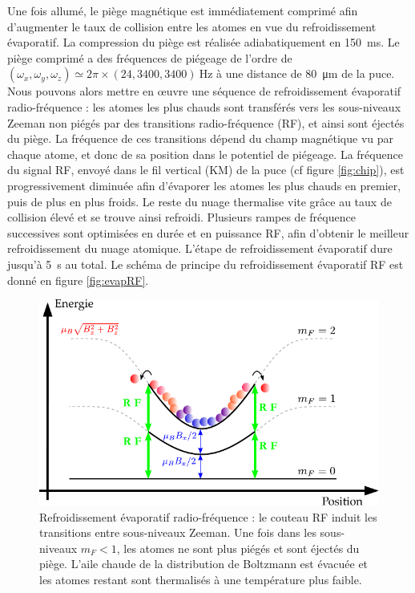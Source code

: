 Une fois allumé, le piège magnétique est immédiatement comprimé afin d'augmenter le taux de collision entre les atomes en vue du refroidissement évaporatif.
La compression du piège est réalisée adiabatiquement en \SI{150}{\ms}.
Le piège comprimé a des fréquences de piégeage de l'ordre de $(\omega_x,\omega_y,\omega_z) \simeq 2\pi \times (\num{24},\num{3400},\num{3400})~\si{\hertz}$ à une distance de \SI{80}{\um} de la puce.
Nous pouvons alors mettre en \oe uvre une séquence de refroidissement évaporatif radio-fréquence :
les atomes les plus chauds sont transférés vers les sous-niveaux Zeeman non piégés par des transitions radio-fréquence (RF), et ainsi sont éjectés du piège.
La fréquence de ces transitions dépend du champ magnétique vu par chaque atome, et donc de sa position dans le potentiel de piégeage.
La fréquence du signal RF, envoyé dans le fil vertical (KM) de la puce (cf figure \ref{fig:chip}), est progressivement diminuée afin d'évaporer les atomes les plus chauds en premier, puis de plus en plus froids.
Le reste du nuage thermalise vite grâce au taux de collision élevé et se trouve ainsi refroidi.
Plusieurs rampes de fréquence successives sont optimisées en durée et en puissance RF, afin d'obtenir le meilleur refroidissement du nuage atomique.
L'étape de refroidissement évaporatif dure jusqu'à \SI{5}{\second} au total.
Le schéma de principe du refroidissement évaporatif RF est donné en figure \eqref{fig:evapRF}.
%
\begin{figure}[!h]
\centering
\includegraphics[width=.7\linewidth]{figures/setup/coldatoms/evapRF}
\caption[Refroidissement évaporatif RF]{Refroidissement évaporatif radio-fréquence :
le \og couteau \fg{} RF induit les transitions entre sous-niveaux Zeeman.
Une fois dans les sous-niveaux $m_F<1$, les atomes ne sont plus piégés et sont éjectés du piège.
L'aile chaude de la distribution de Boltzmann est évacuée et les atomes restant sont thermalisés à une température plus faible.
}
\label{fig:evapRF}
\end{figure}

